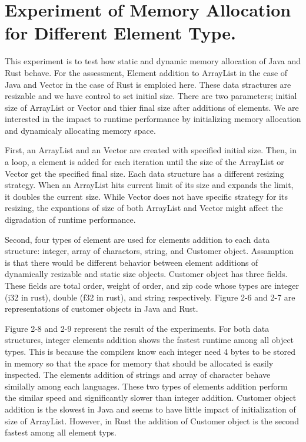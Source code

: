 \section{Experiment of Memory Allocation for Different Element Type.}
\label{sec:history}
This experiment is to test how static and dynamic memory allocation of Java and Rust behave. For the assessment, Element addition to ArrayList in the case of Java and Vector in the case of Rust 
is emploied here. These data stractures are resizable and we have control to set initial size. There are two parameters; initial size of ArrayList or Vector and thier final size after additions of elements. 
We are interested in the impact to runtime performance by initializing memory allocation and dynamicaly allocating memory space.

First, an ArrayList and an Vector are created with specified initial size. Then, in a loop, a element is added for each iteration until the size of the ArrayList or Vector get the specified final size. 
Each data structure has a different resizing strategy. When an ArrayList hits current limit of its size and expands the limit, it doubles the current size.  
While Vector does not have specific strategy for its resizing, the expantions of size of both ArrayList and Vector might affect the digradation of runtime performance.

Second, four types of element are used for elements addition to each data structure: integer, array of charactors, string, and Customer object. 
Assamption is that there would be different behavior between element additions of dynamically resizable and static size objects. 
Customer object has three fields. These fields are total order, weight of order, and zip code whose types are integer (i32 in rust), double (f32 in rust), and string respectively.
Figure 2-6 and 2-7 are representations of customer objects in Java and Rust.

Figure 2-8 and 2-9 represent the result of the experiments. For both data structures, integer elements addition shows the fastest runtime among all object types. 
This is because the compilers know each integer need 4 bytes to be stored in memory so that the space for memory that should be allocated is easily inspected. 
The elements addition of strings and array of character behave similally among each languages. These two types of elements addition perform the similar speed and significantly slower than integer addition. 
Customer object addition is the slowest in Java and seems to have little impact of initialization of size of ArrayList. However, in Rust the addition of Customer object is the second fastest among all element typs.


